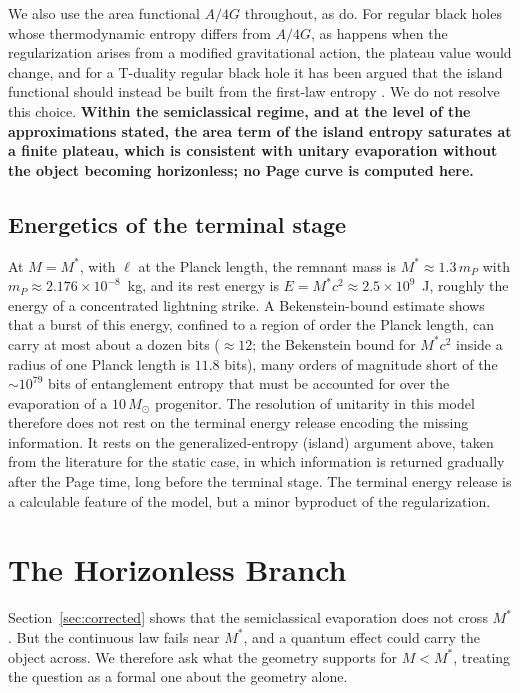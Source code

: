 \documentclass[11pt]{article}
\begin{document}
We also use the area functional $A/4G$ throughout, as \citet{KimNam2021} do. For regular black holes whose thermodynamic entropy differs from $A/4G$, as happens when the regularization arises from a modified gravitational action, the plateau value would change, and for a T-duality regular black hole it has been argued that the island functional should instead be built from the first-law entropy \citep{Anand2026}. We do not resolve this choice. \textbf{Within the semiclassical regime, and at the level of the approximations stated, the area term of the island entropy saturates at a finite plateau, which is consistent with unitary evaporation without the object becoming horizonless; no Page curve is computed here.}

\subsection{Energetics of the terminal stage}

At $M=M^*$, with $\ell$ at the Planck length, the remnant mass is $M^*\approx1.3\,m_P$ with $m_P\approx2.176\times10^{-8}$~kg, and its rest energy is $E=M^*c^2\approx2.5\times10^9$~J, roughly the energy of a concentrated lightning strike. A Bekenstein-bound estimate shows that a burst of this energy, confined to a region of order the Planck length, can carry at most about a dozen bits ($\approx12$; the Bekenstein bound for $M^*c^2$ inside a radius of one Planck length is $11.8$ bits), many orders of magnitude short of the $\sim10^{79}$ bits of entanglement entropy that must be accounted for over the evaporation of a $10\,M_\odot$ progenitor. The resolution of unitarity in this model therefore does not rest on the terminal energy release encoding the missing information. It rests on the generalized-entropy (island) argument above, taken from the literature for the static case, in which information is returned gradually after the Page time, long before the terminal stage. The terminal energy release is a calculable feature of the model, but a minor byproduct of the regularization.

\section{The Horizonless Branch}
\label{sec:horizonless}

Section~\ref{sec:corrected} shows that the semiclassical evaporation does not cross $M^*$. But the continuous law fails near $M^*$, and a quantum effect could carry the object across. We therefore ask what the geometry supports for $M<M^*$, treating the question as a formal one about the geometry alone.
\end{document}
